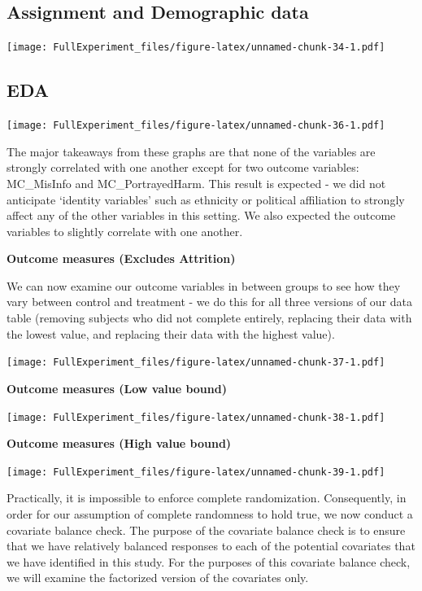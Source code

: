 \documentclass[
]{article}
\begin{document}
\hypertarget{assignment-and-demographic-data}{%
\subsection{Assignment and Demographic
data}\label{assignment-and-demographic-data}}

\texttt{[image: FullExperiment\_files/figure-latex/unnamed-chunk-34-1.pdf]}

\hypertarget{eda}{%
\subsection{EDA}\label{eda}}

\texttt{[image: FullExperiment\_files/figure-latex/unnamed-chunk-36-1.pdf]}

The major takeaways from these graphs are that none of the variables are
strongly correlated with one another except for two outcome variables:
MC\_MisInfo and MC\_PortrayedHarm. This result is expected - we did not
anticipate `identity variables' such as ethnicity or political
affiliation to strongly affect any of the other variables in this
setting. We also expected the outcome variables to slightly correlate
with one another.

\pagebreak

\textbf{Outcome measures (Excludes Attrition)}

We can now examine our outcome variables in between groups to see how
they vary between control and treatment - we do this for all three
versions of our data table (removing subjects who did not complete
entirely, replacing their data with the lowest value, and replacing
their data with the highest value).

\texttt{[image: FullExperiment\_files/figure-latex/unnamed-chunk-37-1.pdf]}

\pagebreak

\textbf{Outcome measures (Low value bound)}

\texttt{[image: FullExperiment\_files/figure-latex/unnamed-chunk-38-1.pdf]}

\pagebreak

\textbf{Outcome measures (High value bound)}

\texttt{[image: FullExperiment\_files/figure-latex/unnamed-chunk-39-1.pdf]}

\pagebreak

Practically, it is impossible to enforce complete randomization.
Consequently, in order for our assumption of complete randomness to hold
true, we now conduct a covariate balance check. The purpose of the
covariate balance check is to ensure that we have relatively balanced
responses to each of the potential covariates that we have identified in
this study. For the purposes of this covariate balance check, we will
examine the factorized version of the covariates only.
\end{document}
